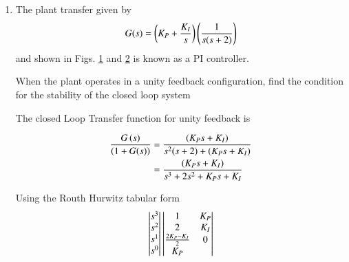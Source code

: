 \begin{enumerate}[label=\thesection.\arabic*.,ref=\thesection.\theenumi]

\item The plant transfer given by
\begin{align}
G(s) = \left(K_{P} + \frac{K_{I}}{s}\right)\left(\frac{1}{s(s+2)}\right)
\label{eq:ee17btech11031_system1}
\end{align}
%
and shown in Figs. \ref{fig:ee17btech11031_1} and \ref{fig:ee17btech11031_2}
is known as a PI controller.

\renewcommand{\thefigure}{\theenumi.\arabic{figure}}
\begin{figure}[!ht]
	\centering
	\resizebox{\columnwidth}{!}{}
\caption{}
\label{fig:ee17btech11031_1}
\end{figure}


%
\begin{figure}[!ht]
    \centering
	\resizebox{\columnwidth}{!}{}
\caption{}
\label{fig:ee17btech11031_2}
\end{figure}
\renewcommand{\thefigure}{\theenumi}

When the plant operates in a unity feedback configuration, find the condition for the stability of the closed loop system 

\solution The closed Loop Transfer function for unity feedback is

\begin{align}
\frac{G\left(s\right)}{\left(1 + G(s)\right)} &= \frac{\left(K_{P}s + K_{I}\right)}{s^2(s+2) + \left(K_{P}s + K_{I}\right)}
\label{eq:ee17btech11031_system}
\\
&= \frac{(K_{P}s + K_{I})}{s^3 + 2s^2 + K_{P}s + K_{I}}
\label{eq:ee17btech11031_system}
\end{align}

Using the Routh Hurwitz tabular form
\begin{align}
\begin{vmatrix}s^3\\s^2\\s^1\\s^0\end{vmatrix}
\begin{vmatrix}1 & K_{P} \\ 2 & K_{I} \\ \frac{2K_{P} - K_{I}}{2} & 0 \\ K_{P}\end{vmatrix}
\end{align}


\end{enumerate}
